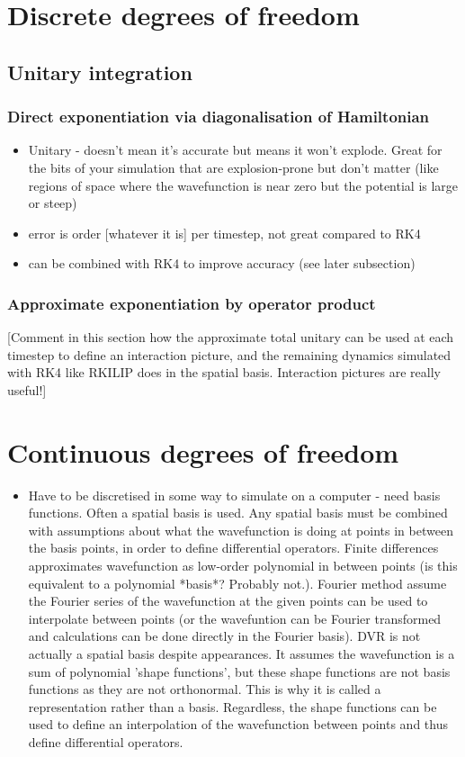 \section{Discrete degrees of freedom}
    \subsection{Unitary integration}
        \subsubsection{Direct exponentiation via diagonalisation of Hamiltonian}
        \begin{itemize}
        \item Unitary - doesn't mean it's accurate but means it won't explode. Great for the bits of your simulation that are explosion-prone but don't matter (like regions of space where the wavefunction is near zero but the potential is large or steep)
        \item error is order [whatever it is] per timestep, not great compared to RK4
        \item can be combined with RK4 to improve accuracy (see later subsection)
        \end{itemize}
        \subsubsection{Approximate exponentiation by operator product}

        [Comment in this section how the approximate total unitary can be used at each timestep to define an interaction picture, and the remaining dynamics simulated with RK4 like RKILIP does in the spatial basis. Interaction pictures are really useful!]
\section{Continuous degrees of freedom}
    \begin{itemize}
        \item Have to be discretised in some way to simulate on a computer - need basis functions. Often a spatial basis is used. Any spatial basis must be combined with assumptions about what the wavefunction is doing at points in between the basis points, in order to define differential operators. Finite differences approximates wavefunction as low-order polynomial in between points (is this equivalent to a polynomial *basis*? Probably not.). Fourier method assume the Fourier series of the wavefunction at the given points can be used to interpolate between points (or the wavefuntion can be Fourier transformed and calculations can be done directly in the Fourier basis). DVR is not actually a spatial basis despite appearances. It assumes the wavefunction is a sum of polynomial 'shape functions', but these shape functions are not basis functions as they are not orthonormal. This is why it is called a representation rather than a basis. Regardless, the shape functions can be used to define an interpolation of the wavefunction between points and thus define differential operators.

    \end{itemize}
